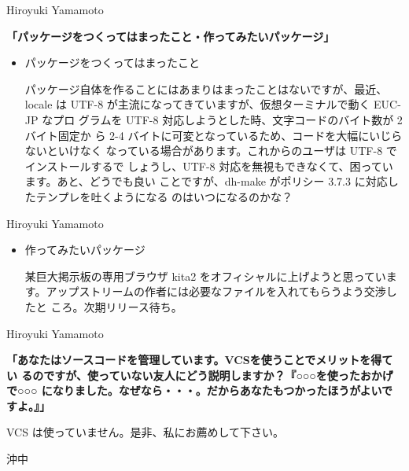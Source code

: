 \documentclass[cjk,dvipdfmx,12pt]{beamer}
\begin{document}

\begin{frame}{Hiroyuki Yamamoto}

\textbf{「パッケージをつくってはまったこと・作ってみたいパッケージ」}

\begin{itemize}
 \item  パッケージをつくってはまったこと

 パッケージ自体を作ることにはあまりはまったことはないですが、最近、locale
 は UTF-8 が主流になってきていますが、仮想ターミナルで動く EUC-JP なプロ
 グラムを UTF-8 対応しようとした時、文字コードのバイト数が 2 バイト固定か
 ら 2-4 バイトに可変となっているため、コードを大幅にいじらないといけなく
 なっている場合があります。これからのユーザは UTF-8 でインストールするで
 しょうし、UTF-8 対応を無視もできなくて、困っています。あと、どうでも良い
 ことですが、dh-make がポリシー 3.7.3 に対応したテンプレを吐くようになる
 のはいつになるのかな？
\end{itemize}
\end{frame}\begin{frame}{Hiroyuki Yamamoto}
\begin{itemize}

 \item  作ってみたいパッケージ

 某巨大掲示板の専用ブラウザ kita2 をオフィシャルに上げようと思っていま
 す。アップストリームの作者には必要なファイルを入れてもらうよう交渉したと
 ころ。次期リリース待ち。
\end{itemize}

\end{frame}\begin{frame}{Hiroyuki Yamamoto}

\textbf{「あなたはソースコードを管理しています。VCSを使うことでメリットを得てい
るのですが、使っていない友人にどう説明しますか？『○○○を使ったおかげで○○○
になりました。なぜなら・・・。だからあなたもつかったほうがよいですよ。』」}

VCS は使っていません。是非、私にお薦めして下さい。

\end{frame}\begin{frame}{沖中}



\end{frame}
\end{document}
